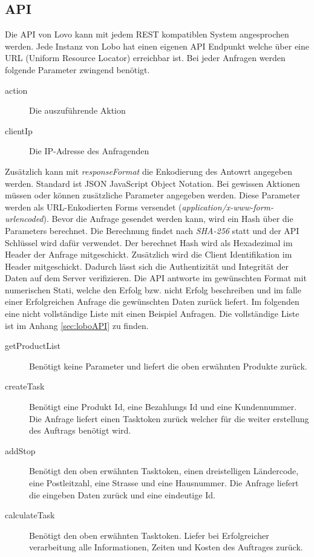 \subsection{API}

Die API von Lovo kann mit jedem REST kompatiblen System angesprochen werden. Jede Instanz von Lobo hat einen eigenen API Endpunkt welche über eine URL (Uniform Resource Locator) erreichbar ist. Bei jeder Anfragen werden folgende Parameter zwingend benötigt.
\begin{description}
	\item[action] Die auszuführende Aktion
	\item[clientIp] Die IP-Adresse des Anfragenden
\end{description}
Zusätzlich kann mit \textit{responseFormat} die Enkodierung des Antowrt angegeben werden. Standard ist JSON {JavaScript Object Notation}. Bei gewissen Aktionen   müssen oder können zusätzliche Parameter angegeben werden. Diese Parameter werden als URL-Enkodierten Forms versendet (\textit{application/x-www-form-urlencoded}).
Bevor die Anfrage gesendet werden kann, wird ein Hash über die Parameters berechnet. Die Berechnung findet nach \textit{SHA-256} statt und der API Schlüssel wird dafür verwendet. Der berechnet Hash wird als Hexadezimal im Header der Anfrage mitgeschickt. Zusätzlich wird die Client Identifikation im Header mitgeschickt. Dadurch lässt sich die Authentizität und Integrität der Daten auf dem Server verifizieren. Die API antworte im gewünschten Format mit numerischen Stati, welche den Erfolg bzw. nicht Erfolg beschreiben und im falle einer Erfolgreichen Anfrage die gewünschten Daten zurück liefert. Im folgenden eine nicht vollständige Liste mit einen Beispiel Anfragen. Die vollständige Liste ist im Anhang \ref{sec:loboAPI} zu finden.

\begin{description}
	\item[getProductList] Benötigt keine Parameter und liefert die oben erwähnten Produkte zurück.
	\item[createTask] Benötigt eine Produkt Id, eine Bezahlungs Id und eine Kundennummer. Die Anfrage liefert einen Tasktoken zurück welcher für die weiter erstellung des Auftrags benötigt wird.
	\item[addStop] Benötigt den oben erwähnten Tasktoken, einen dreistelligen Ländercode, eine Postleitzahl, eine Strasse und eine Hausnummer. Die Anfrage liefert die eingeben Daten zurück und eine eindeutige Id.
	\item[calculateTask] Benötigt den oben erwähnten Tasktoken. Liefer bei Erfolgreicher verarbeitung alle Informationen, Zeiten und Kosten des Auftrages zurück.
\end{description}
